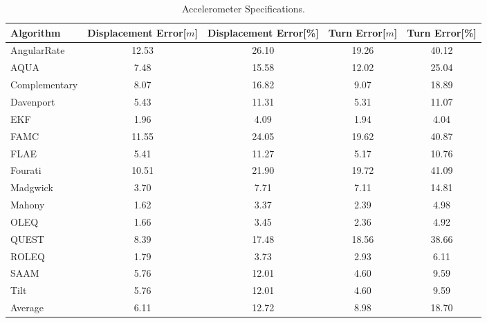\begin{table}[H]
    \begin{center}
        \begin{tabular}[t]{lcccc}
            \hline
            Algorithm                   & Displacement Error[$m$] & Displacement Error[\%]      & Turn Error[$m$]  & Turn Error[\%]             \\
            \hline 
            AngularRate            & 12.53  & 26.10 & 19.26 & 40.12              \\            AQUA            & 7.48  & 15.58 & 12.02 & 25.04              \\            Complementary            & 8.07  & 16.82 & 9.07 & 18.89              \\            Davenport            & 5.43  & 11.31 & 5.31 & 11.07              \\            EKF            & 1.96  & 4.09 & 1.94 & 4.04              \\            FAMC            & 11.55  & 24.05 & 19.62 & 40.87              \\            FLAE            & 5.41  & 11.27 & 5.17 & 10.76              \\            Fourati            & 10.51  & 21.90 & 19.72 & 41.09              \\            Madgwick            & 3.70  & 7.71 & 7.11 & 14.81              \\            Mahony            & 1.62  & 3.37 & 2.39 & 4.98              \\            OLEQ            & 1.66  & 3.45 & 2.36 & 4.92              \\            QUEST            & 8.39  & 17.48 & 18.56 & 38.66              \\            ROLEQ            & 1.79  & 3.73 & 2.93 & 6.11              \\            SAAM            & 5.76  & 12.01 & 4.60 & 9.59              \\            Tilt            & 5.76  & 12.01 & 4.60 & 9.59              \\
            \hline
            Average & 6.11 & 12.72 & 8.98 & 18.70
        \end{tabular}
        \caption{Accelerometer Specifications. }
        \label{tab:accelerometer_specification}
    \end{center}
\end{table}